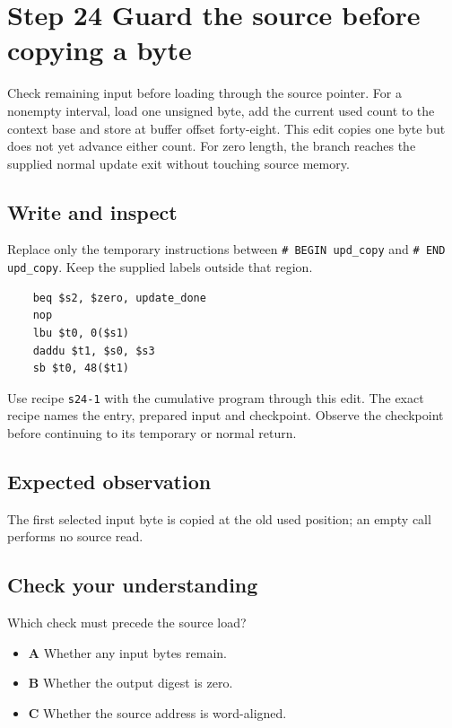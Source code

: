 \section{Step 24 Guard the source before copying a byte}\label{sha-s24}

Check remaining input before loading through the source pointer. For a nonempty interval, load one unsigned byte, add the current used count to the context base and store at buffer offset forty-eight. This edit copies one byte but does not yet advance either count. For zero length, the branch reaches the supplied normal update exit without touching source memory.

\subsection{Write and inspect}
Replace only the temporary instructions between \texttt{\# BEGIN upd\_copy} and \texttt{\# END upd\_copy}. Keep the supplied labels outside that region.

\begin{verbatim}
    beq $s2, $zero, update_done
    nop
    lbu $t0, 0($s1)
    daddu $t1, $s0, $s3
    sb $t0, 48($t1)
\end{verbatim}

Use recipe \texttt{s24-1} with the cumulative program through this edit. The exact recipe names the entry, prepared input and checkpoint. Observe the checkpoint before continuing to its temporary or normal return.

\subsection{Expected observation}
The first selected input byte is copied at the old used position; an empty call performs no source read.

\subsection{Check your understanding}
Which check must precede the source load?

\begin{itemize}
  \item \textbf{A} Whether any input bytes remain.
  \item \textbf{B} Whether the output digest is zero.
  \item \textbf{C} Whether the source address is word-aligned.
\end{itemize}
